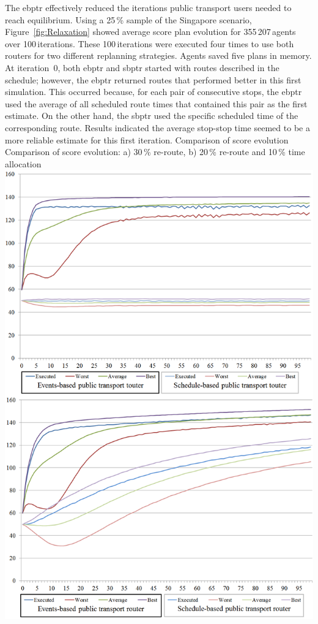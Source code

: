 The \gls{ebptr} effectively reduced the iterations public transport users needed to reach equilibrium. Using a 25\,\% sample of the Singapore scenario, Figure~\ref{fig:Relaxation} showed average score plan evolution for 355\,207\,agents over 100\,iterations. These 100\,iterations were executed four times to use both routers for two different replanning strategies. Agents saved five plans in memory. At iteration~0, both \gls{ebptr} and \gls{sbptr} started with routes described in the schedule; however, the \gls{ebptr} returned routes that performed better in this first simulation. This occurred because, for each pair  of consecutive stops, the \gls{ebptr} used the average of all scheduled route times that contained this pair as the first estimate. On the other hand, the \gls{sbptr} used the specific scheduled time of the corresponding route. Results indicated the average stop-stop time seemed to be a more reliable estimate for this first iteration.
\createfigure
{Comparison of score evolution}
{Comparison of score evolution: a) 30\,\% re-route, b) 20\,\% re-route and 10\,\% time allocation}
{\label{fig:Relaxation}}
{\includegraphics[width=1.0\textwidth]{extending/figures/ebr/Relaxation.png}}
{}


